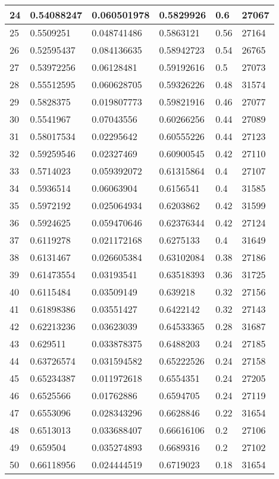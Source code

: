 \begin{longtable}{|l|l|l|l|l|l|}
24 & 0.54088247 & 0.060501978 & 0.5829926 & 0.6 & 27067 \\ \hline 
25 & 0.5509251 & 0.048741486 & 0.5863121 & 0.56 & 27164 \\ \hline 
26 & 0.52595437 & 0.084136635 & 0.58942723 & 0.54 & 26765 \\ \hline 
27 & 0.53972256 & 0.06128481 & 0.59192616 & 0.5 & 27073 \\ \hline 
28 & 0.55512595 & 0.060628705 & 0.59326226 & 0.48 & 31574 \\ \hline 
29 & 0.5828375 & 0.019807773 & 0.59821916 & 0.46 & 27077 \\ \hline 
30 & 0.5541967 & 0.07043556 & 0.60266256 & 0.44 & 27089 \\ \hline 
31 & 0.58017534 & 0.02295642 & 0.60555226 & 0.44 & 27123 \\ \hline 
32 & 0.59259546 & 0.02327469 & 0.60900545 & 0.42 & 27110 \\ \hline 
33 & 0.5714023 & 0.059392072 & 0.61315864 & 0.4 & 27107 \\ \hline 
34 & 0.5936514 & 0.06063904 & 0.6156541 & 0.4 & 31585 \\ \hline 
35 & 0.5972192 & 0.025064934 & 0.6203862 & 0.42 & 31599 \\ \hline 
36 & 0.5924625 & 0.059470646 & 0.62376344 & 0.42 & 27124 \\ \hline 
37 & 0.6119278 & 0.021172168 & 0.6275133 & 0.4 & 31649 \\ \hline 
38 & 0.6131467 & 0.026605384 & 0.63102084 & 0.38 & 27186 \\ \hline 
39 & 0.61473554 & 0.03193541 & 0.63518393 & 0.36 & 31725 \\ \hline 
40 & 0.6115484 & 0.03509149 & 0.639218 & 0.32 & 27156 \\ \hline 
41 & 0.61898386 & 0.03551427 & 0.6422142 & 0.32 & 27143 \\ \hline 
42 & 0.62213236 & 0.03623039 & 0.64533365 & 0.28 & 31687 \\ \hline 
43 & 0.629511 & 0.033878375 & 0.6488203 & 0.24 & 27185 \\ \hline 
44 & 0.63726574 & 0.031594582 & 0.65222526 & 0.24 & 27158 \\ \hline 
45 & 0.65234387 & 0.011972618 & 0.6554351 & 0.24 & 27205 \\ \hline 
46 & 0.6525566 & 0.01762886 & 0.6594705 & 0.24 & 27119 \\ \hline 
47 & 0.6553096 & 0.028343296 & 0.6628846 & 0.22 & 31654 \\ \hline 
48 & 0.6513013 & 0.033688407 & 0.66616106 & 0.2 & 27106 \\ \hline 
49 & 0.659504 & 0.035274893 & 0.6689316 & 0.2 & 27102 \\ \hline 
50 & 0.66118956 & 0.024444519 & 0.6719023 & 0.18 & 31654 \\ \hline 
\end{longtable}